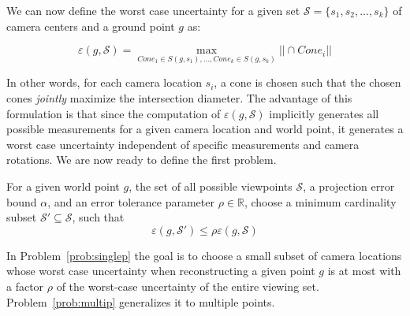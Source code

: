 We can now define the worst case uncertainty for a given set $\mathcal{S} = \{s_1,s_2,...,s_k\}$  of camera centers and a ground point $g$ as:

$$\varepsilon(g, \mathcal{S}) = \max_{Cone_1 \in S(g,s_1), \ldots, Cone_k \in S(g, s_k)} ||\cap Cone_i ||$$

In other words, for each camera location $s_i$, a cone is chosen such that the chosen cones \emph{jointly} maximize the intersection diameter.
The advantage of this formulation is that since  the computation of $\varepsilon(g, \mathcal{S})$ implicitly generates all possible measurements for a given camera location and world point, it generates a worst case uncertainty independent of specific measurements and camera rotations.
We are now ready to define the first problem.

\begin{problem}
For a given world point $g$, the set of all possible viewpoints $\mathcal{S}$, a projection error bound $\alpha$, 
and an error tolerance parameter $\rho \in \mathbb{R}$,
choose a minimum cardinality subset $\mathcal{S'} \subseteq \mathcal{S}$, such that
$$\varepsilon(g,\mathcal{S'}) \leq \rho \varepsilon(g,\mathcal{S})$$
\label{prob:singlep}
\end{problem}

In Problem~\ref{prob:singlep} the goal is to choose a small subset of camera locations whose worst case uncertainty when reconstructing a given point $g$ is at most with a factor $\rho$ of the worst-case uncertainty of the entire viewing set. Problem~\ref{prob:multip} generalizes it to multiple points.

%

